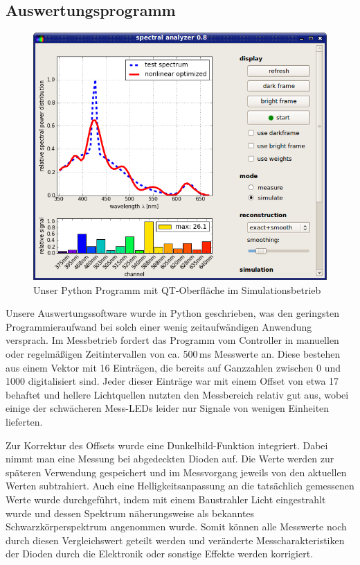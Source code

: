 \documentclass[11pt]{scrartcl}
\begin{document}
\subsection{Auswertungsprogramm} %
\begin{figure}[H]
\begin{center}
\includegraphics[width=1.\textwidth]{screenshot.png}
\end{center}
\vspace{-1.5\baselineskip}
\caption{Unser Python Programm mit QT-Oberfläche im Simulationsbetrieb}
\label{fig:screenschot}
\end{figure}
Unsere Auswertungssoftware wurde in Python geschrieben, was den geringsten Programmieraufwand bei solch einer wenig zeitaufwändigen Anwendung versprach.
Im Messbetrieb fordert das Programm vom Controller in manuellen oder regelmäßigen Zeitintervallen von ca. 500\,ms Messwerte an.
Diese bestehen aus einem Vektor mit 16 Einträgen, die bereits auf Ganzzahlen zwischen 0 und 1000 digitalisiert sind.
Jeder dieser Einträge war mit einem Offset von etwa 17 behaftet und hellere Lichtquellen nutzten den Messbereich relativ gut aus, wobei einige der schwächeren Mess-LEDs leider nur Signale von wenigen Einheiten lieferten.

Zur Korrektur des Offsets wurde eine Dunkelbild-Funktion integriert.
Dabei nimmt man eine Messung bei abgedeckten Dioden auf.
Die Werte werden zur späteren Verwendung gespeichert und im Messvorgang jeweils von den aktuellen Werten subtrahiert.
Auch eine Helligkeitsanpassung an die tatsächlich gemessenen Werte wurde durchgeführt, indem mit einem Baustrahler Licht eingestrahlt wurde und dessen Spektrum näherungsweise als bekanntes Schwarzkörperspektrum angenommen wurde.
Somit können alle Messwerte noch durch diesen Vergleichswert geteilt werden und veränderte Messcharakteristiken der Dioden durch die Elektronik oder sonstige Effekte werden korrigiert.
\end{document}
